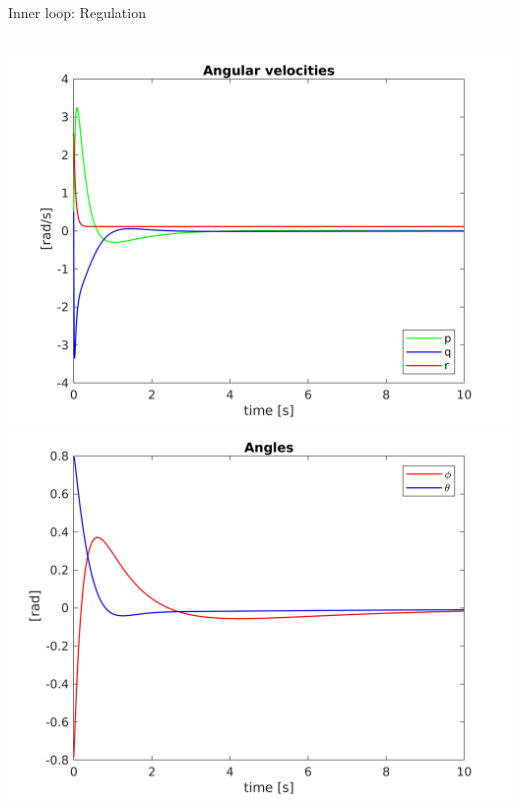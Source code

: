 \begin{frame}[fragile]{Inner loop: Regulation}
  \begin{columns}
    \includegraphics[width=\textwidth]{../report/Images/innerControlVel}
    \includegraphics[width=\textwidth]{../report/Images/innerControlAngles}
  \end{columns}
\end{frame}

